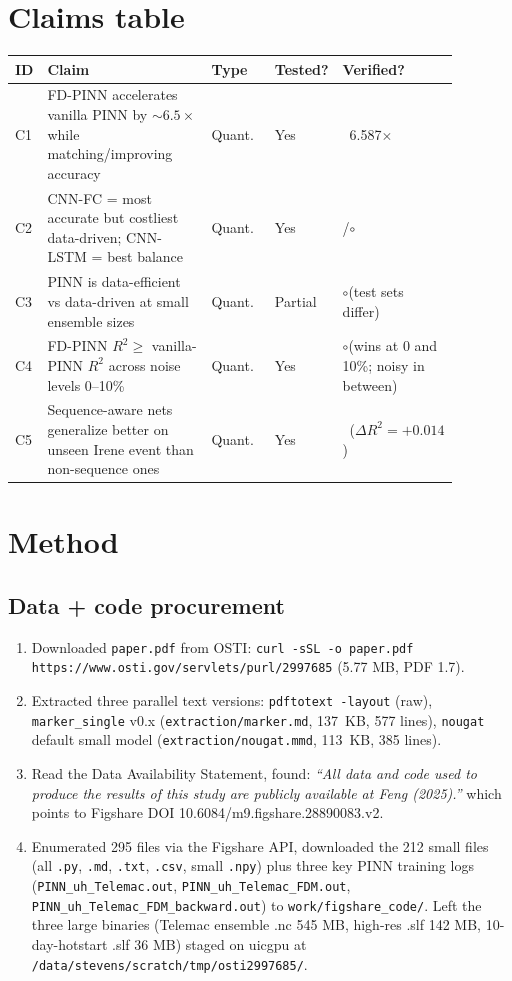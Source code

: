 \documentclass[11pt]{article}
\newcommand{\OK}{\textcolor{green!60!black}{\checkmark}}
\newcommand{\PART}{\textcolor{orange!80!black}{$\circ$}}
\begin{document}
\section{Claims table}
\begin{longtable}{p{0.06\linewidth} p{0.55\linewidth} p{0.09\linewidth} p{0.09\linewidth} p{0.09\linewidth}}
\toprule
ID & Claim & Type & Tested? & Verified? \\
\midrule
\endhead
C1 & FD-PINN accelerates vanilla PINN by $\sim 6.5\times$ while matching/improving accuracy & Quant.\ & Yes & \OK\ 6.587$\times$ \\
C2 & CNN-FC = most accurate but costliest data-driven; CNN-LSTM = best balance & Quant.\ & Yes & \OK/\PART \\
C3 & PINN is data-efficient vs data-driven at small ensemble sizes & Quant.\ & Partial & \PART (test sets differ) \\
C4 & FD-PINN $R^2 \ge$ vanilla-PINN $R^2$ across noise levels 0--10\% & Quant.\ & Yes & \PART (wins at 0 and 10\%; noisy in between) \\
C5 & Sequence-aware nets generalize better on unseen Irene event than non-sequence ones & Quant.\ & Yes & \OK\ ($\Delta R^2 = +0.014$) \\
\bottomrule
\end{longtable}

\section{Method}
\subsection{Data + code procurement}
\begin{enumerate}
  \item Downloaded \texttt{paper.pdf} from OSTI: \texttt{curl -sSL -o paper.pdf https://www.osti.gov/servlets/purl/2997685}
        (5.77 MB, PDF 1.7).
  \item Extracted three parallel text versions: \texttt{pdftotext -layout} (raw),
        \texttt{marker\_single} v0.x (\texttt{extraction/marker.md}, 137~KB, 577 lines),
        \texttt{nougat} default small model (\texttt{extraction/nougat.mmd}, 113~KB, 385 lines).
  \item Read the Data Availability Statement, found:
        \emph{``All data and code used to produce the results of this study are publicly
              available at Feng (2025).''} which points to Figshare
              DOI 10.6084/m9.figshare.28890083.v2.
  \item Enumerated 295 files via the Figshare API, downloaded the 212 small files (all \texttt{.py},
        \texttt{.md}, \texttt{.txt}, \texttt{.csv}, small \texttt{.npy}) plus three key PINN
        training logs (\texttt{PINN\_uh\_Telemac.out}, \texttt{PINN\_uh\_Telemac\_FDM.out},
        \texttt{PINN\_uh\_Telemac\_FDM\_backward.out}) to \texttt{work/figshare\_code/}. Left the
        three large binaries (Telemac ensemble .nc 545 MB, high-res .slf 142 MB, 10-day-hotstart
        .slf 36 MB) staged on uicgpu at \texttt{/data/stevens/scratch/tmp/osti2997685/}.
\end{enumerate}
\end{document}

